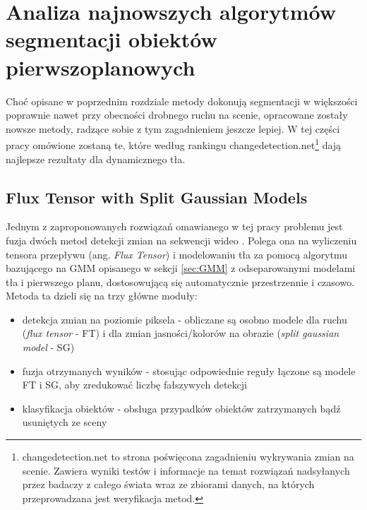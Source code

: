\chapter{Analiza najnowszych algorytmów segmentacji obiektów pierwszoplanowych}
\label{cha:analiza}

Choć opisane w poprzednim rozdziale metody dokonują segmentacji w większości poprawnie nawet przy obecności drobnego ruchu na scenie, opracowane zostały nowsze metody, radzące sobie z tym zagadnieniem jeszcze lepiej. W tej części pracy omówione zostaną te, które według rankingu changedetection.net\footnote{changedetection.net to strona poświęcona zagadnieniu wykrywania zmian na scenie. Zawiera wyniki testów i informacje na temat rozwiązań nadsyłanych przez badaczy z całego świata wraz ze zbiorami danych, na których przeprowadzana jest weryfikacja metod.} dają najlepsze rezultaty dla dynamicznego tła. 


\section{Flux Tensor with Split Gaussian Models}
\label{sec:FTSG}

Jednym z zaproponowanych rozwiązań omawianego w tej pracy problemu jest fuzja dwóch metod detekcji zmian na sekwencji wideo \cite{6910016}. Polega ona na wyliczeniu tensora przepływu (ang. \textit{Flux Tensor}) i modelowaniu tła za pomocą algorytmu bazującego na GMM opisanego w sekcji \ref{sec:GMM} z odseparowanymi modelami tła i pierwszego planu, dostosowującą się automatycznie przestrzennie i czasowo.
Metoda ta dzieli się na trzy główne moduły:
\begin{itemize}
\item detekcja zmian na poziomie piksela - obliczane są osobno modele dla ruchu (\textit{flux tensor} - FT) i dla zmian jasności/kolorów na obrazie (\textit{split gaussian model} - SG)
\item fuzja otrzymanych wyników - stosując odpowiednie reguły łączone są modele FT i SG, aby zredukować liczbę fałszywych detekcji
\item klasyfikacja obiektów - obsługa przypadków obiektów zatrzymanych bądź usuniętych ze sceny
\end{itemize}
